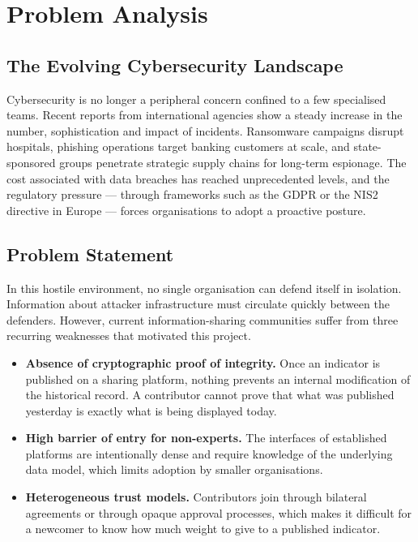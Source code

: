 \documentclass[12pt,a4paper,oneside]{book}
\begin{document}
{{%
\section{Problem Analysis}

\subsection{The Evolving Cybersecurity Landscape}

Cybersecurity is no longer a peripheral concern confined to a few
specialised teams. Recent reports from international agencies show a steady
increase in the number, sophistication and impact of incidents. Ransomware
campaigns disrupt hospitals, phishing operations target banking customers at
scale, and state-sponsored groups penetrate strategic supply chains for
long-term espionage. The cost associated with data breaches has reached
unprecedented levels, and the regulatory pressure --- through frameworks
such as the GDPR or the NIS2 directive in Europe --- forces organisations to
adopt a proactive posture.

\subsection{Problem Statement}

In this hostile environment, no single organisation can defend itself in
isolation. Information about attacker infrastructure must circulate quickly
between the defenders. However, current information-sharing communities
suffer from three recurring weaknesses that motivated this project.

\begin{itemize}
\item \textbf{Absence of cryptographic proof of integrity.} Once an
indicator is published on a sharing platform, nothing prevents an internal
modification of the historical record. A contributor cannot prove that what
was published yesterday is exactly what is being displayed today.
\item \textbf{High barrier of entry for non-experts.} The interfaces of
established platforms are intentionally dense and require knowledge of the
underlying data model, which limits adoption by smaller organisations.
\item \textbf{Heterogeneous trust models.} Contributors join through
bilateral agreements or through opaque approval processes, which makes it
difficult for a newcomer to know how much weight to give to a published
indicator.
\end{itemize}

}}
\end{document}
